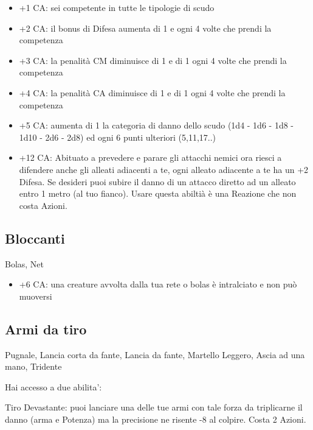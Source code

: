\documentclass[a4paper,11pt,twoside,openany]{book}
\begin{document}
\begin{itemize}
	\item +1 CA: sei competente in tutte le tipologie di scudo

\item +2 CA: il bonus di Difesa aumenta di 1 e ogni 4 volte che prendi la competenza

\item +3 CA: la penalità CM diminuisce di 1 e di 1 ogni 4 volte che prendi la competenza

\item +4 CA: la penalità CA diminuisce di 1 e di 1 ogni 4 volte che prendi la competenza

\item +5 CA: aumenta di 1 la categoria di danno dello scudo (1d4 - 1d6 - 1d8 - 1d10 - 2d6 - 2d8) ed ogni 6 punti ulteriori (5,11,17..)

\item +12 CA: Abituato a prevedere e parare gli attacchi nemici ora riesci a difendere anche gli alleati adiacenti a te, ogni alleato adiacente a te ha un +2 Difesa. Se desideri puoi subire il danno di un attacco diretto ad un alleato entro 1 metro (al tuo fianco). Usare questa abiltià è una Reazione che non costa Azioni.

\end{itemize}

\subsection{Bloccanti} Bolas, Net

\begin{itemize}
	\item +6 CA: una creature avvolta dalla tua rete o bolas è intralciato
e non può muoversi

\end{itemize}

\subsection{Armi da tiro} Pugnale, Lancia corta da fante, Lancia da fante, Martello Leggero, Ascia ad una mano, Tridente

Hai accesso a due abilita':

Tiro Devastante: puoi lanciare una delle tue armi con tale forza da triplicarne il danno (arma e Potenza) ma la precisione ne risente -8 al colpire. Costa 2 Azioni.
\end{document}
